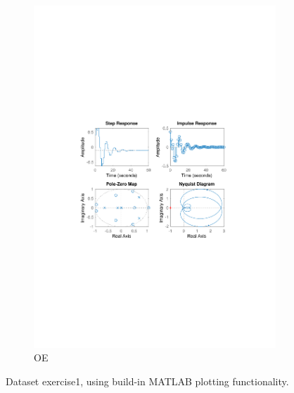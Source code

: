 \documentclass[]{article}
\begin{document}
\begin{figure}[ht]
\begin{subfigure}{.49\textwidth}
	\includegraphics[trim= 10cm 8cm 10cm 8cm, scale=0.4]{figures/3-OE-Ex1.pdf}
	\caption{OE}
	\label{fig:Ex1-OE}
\end{subfigure}
\caption{Dataset exercise1, using build-in MATLAB plotting functionality.}
\label{fig:Ex1}
\end{figure}
\end{document}
